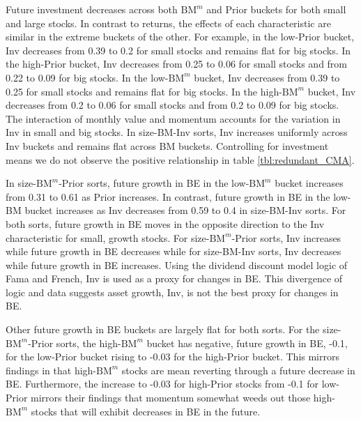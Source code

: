Future investment decreases across both $\text{BM}^m$ and Prior buckets for
both small and large stocks. In contrast to returns, the effects of each
characteristic are similar in the extreme buckets of the other. For example, in
the low-Prior bucket, Inv decreases from 0.39 to 0.2 for small stocks and
remains flat for big stocks. In the high-Prior bucket, Inv decreases from 0.25
to 0.06 for small stocks and from 0.22 to 0.09 for big stocks. In the
low-$\text{BM}^m$ bucket, Inv decreases from 0.39 to 0.25 for small stocks and
remains flat for big stocks. In the high-$\text{BM}^m$ bucket, Inv decreases
from 0.2 to 0.06 for small stocks and from 0.2 to 0.09 for big stocks. The
interaction of monthly value and momentum accounts for the variation in Inv in
small and big stocks. In size-BM-Inv sorts, Inv increases uniformly across Inv
buckets and remains flat across BM buckets. Controlling for investment means we
do not observe the positive relationship in table \ref{tbl:redundant_CMA}.

In size-$\text{BM}^m$-Prior sorts, future growth in BE in the low-$\text{BM}^m$
bucket increases from 0.31 to 0.61 as Prior increases. In contrast, future
growth in BE in the low-BM bucket increases as Inv decreases from 0.59 to 0.4
in size-BM-Inv sorts. For both sorts, future growth in BE moves in the opposite
direction to the Inv characteristic for small, growth stocks.
For size-$\text{BM}^m$-Prior sorts, Inv
increases while future growth in BE decreases while for size-BM-Inv sorts, Inv
decreases while future growth in BE increases. Using the dividend discount
model logic of Fama and French, Inv is used as a proxy for changes in BE. This
divergence of logic and data suggests asset growth, Inv, is not the best proxy
for changes in BE.

Other future growth in BE buckets are largely flat for both sorts. For the
size-$\text{BM}^m$-Prior sorts, the high-$\text{BM}^m$ bucket has negative,
future growth in BE, -0.1, for the low-Prior bucket rising to -0.03 for the
high-Prior bucket. This mirrors findings in \textcite{kok2017facts} that
high-$\text{BM}^m$ stocks are mean reverting through a future decrease in BE.
Furthermore, the increase to -0.03 for high-Prior stocks from -0.1
for low-Prior mirrors their findings that momentum somewhat weeds out
those high-$\text{BM}^m$ stocks that will exhibit decreases in BE in the
future.

